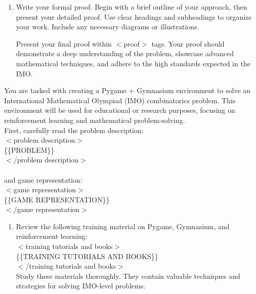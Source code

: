 {\begin{tcolorbox}
\begin{enumerate}
\item Write your formal proof. Begin with a brief outline of your approach, then present your detailed proof. Use clear headings and subheadings to organize your work. Include any necessary diagrams or illustrations.

Present your final proof within $<$proof$>$ tags. Your proof should demonstrate a deep understanding of the problem, showcase advanced mathematical techniques, and adhere to the high standards expected in the IMO.
\end{enumerate}

\setlength{\parskip}{1em}
\end{tcolorbox}

\begin{tcolorbox}[enhanced, breakable, rounded corners, 
    colback=brown!5!white, colframe=brown!75!black,
    colbacktitle=brown!85!black, fonttitle=\bfseries, coltitle=white,
    title=Encoding Prompt, width=\columnwidth]
You are tasked with creating a Pygame + Gymnasium environment to solve an International Mathematical Olympiad (IMO) combinatorics problem. This environment will be used for educational or research purposes, focusing on reinforcement learning and mathematical problem-solving.\\

First, carefully read the problem description:\\
$<$problem description$>$\\
\{\{PROBLEM\}\}\\
$<$/problem description$>$\\
\\
and game representation:\\
$<$game representation$>$\\
\{\{GAME REPRESENTATION\}\}\\
$<$/game representation$>$\\

\begin{enumerate}

\item Review the following training material on Pygame, Gymnasium, and reinforcement learning: \\
$<$training tutorials and books$>$ \\
\{\{TRAINING TUTORIALS AND BOOKS\}\} \\
$<$/training tutorials and books$>$ \\
Study these materials thoroughly. They contain valuable techniques and strategies for solving IMO-level problems.\\


\end{enumerate}
\end{tcolorbox}}
